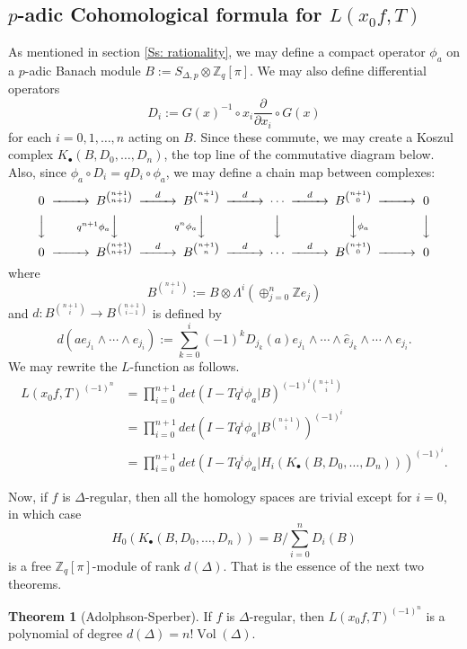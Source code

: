 \documentclass[a4paper,oneside,11pt]{article}
\theoremstyle{plain} \theoremstyle{definition}
\newtheorem{Thm}{Theorem}[section]
\theoremstyle{remark}
\def\bb #1{ {\mathbb #1} }
\newcommand{\vol}{\mathop{\mathrm{Vol}}}
\def\sd { S_{\Delta, p} }
\begin{document}
\subsection{$p$-adic Cohomological formula for
$L(x_0f,T)$}\label{Ss: Cohom Form} As mentioned in section
\ref{Ss: rationality}, we may define a compact operator $\phi_a$
on a $p$-adic Banach module $B := \sd \otimes \bb Z_q[\pi]$. We
may also define differential operators
\[
D_i := G(x)^{-1} \circ x_i \frac{\partial}{\partial x_i} \circ
G(x)
\]
for each $i=0, 1, \ldots, n$ acting on $B$. Since these commute,
we may create a Koszul complex $K_\bullet(B, D_0, \ldots, D_n)$,
the top line of the commutative diagram below. Also, since $\phi_a
\circ D_i = q D_i \circ \phi_a$, we may define a chain map between
complexes:
\[
\begin{CD}
0 @>>> B^{\binom{n+1}{n+1}} @>d>> B^{\binom{n+1}{n}} @>d>> \cdots
@>d>> B^{\binom{n+1}{0}} @>>> 0 \\
@VVV @Vq^{n+1}\phi_aVV @Vq^n \phi_aVV @VVV @VV\phi_aV @VVV \\
0 @>>> B^{\binom{n+1}{n+1}} @>d>> B^{\binom{n+1}{n}} @>d>> \cdots
@>d>> B^{\binom{n+1}{0}} @>>> 0
\end{CD}
\]
where
\[
B^{\binom{n+1}{i}} := B \otimes \Lambda^i (\oplus_{j=0}^n \bb Z e_j)
\]
and $d: B^{\binom{n+1}{i}} \rightarrow B^{\binom{n+1}{i-1}}$ is
defined by
\[
d(a e_{j_1} \wedge \cdots \wedge e_{j_i}) := \sum_{k=0}^i (-1)^k
D_{j_k}(a) e_{j_1} \wedge \cdots \wedge \hat e_{j_k} \wedge \cdots
\wedge e_{j_i}.
\]
We may rewrite the $L$-function as follows.
\begin{align*}
L(x_0 f, T)^{(-1)^n} &= \prod_{i=0}^{n+1} det(I - T q^i \phi_a |
B)^{(-1)^i \binom{n+1}{i}} \\
&= \prod_{i=0}^{n+1} det(I - T q^i \phi_a |
B^{\binom{n+1}{i}})^{(-1)^i} \\
&= \prod_{i=0}^{n+1} det(I - T q^i \phi_a | H_i( K_\bullet(B, D_0,
\ldots, D_n)))^{(-1)^i}.
\end{align*}

Now, if $f$ is $\Delta$-regular, then all the
homology spaces are trivial except for $i=0$, in which case 
$$H_0( K_\bullet(B, D_0, \ldots, D_n)) = B/\sum_{i=0}^n D_i(B)$$
is a free $\bb Z_q[\pi]$-module of rank $d(\Delta)$. 
That is the essence of the next two theorems.

\begin{Thm}[Adolphson-Sperber]
If $f$ is $\Delta$-regular, then $L(x_0f,T)^{(-1)^n}$ is a
polynomial of degree $d(\Delta)=n!\vol(\Delta)$.
\end{Thm}
\end{document}
